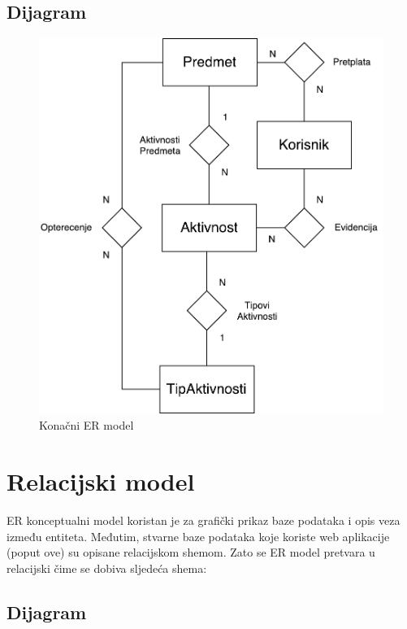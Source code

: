 \documentclass[times, utf8, zavrsni, numeric]{fer}
\begin{document}
\subsection{Dijagram}

\begin{figure}[H]
\centering
\includegraphics[scale=0.8]{img/er-model.pdf}
\caption{Konačni ER model}
\label{fig:er-model}
\end{figure}

\section{Relacijski model}

ER konceptualni model koristan je za grafički prikaz baze podataka i opis veza između entiteta. Međutim, stvarne baze podataka koje koriste web aplikacije (poput ove) su opisane relacijskom shemom. Zato se ER model pretvara u relacijski čime se dobiva sljedeća shema:

\subsection{Dijagram}
\end{document}
